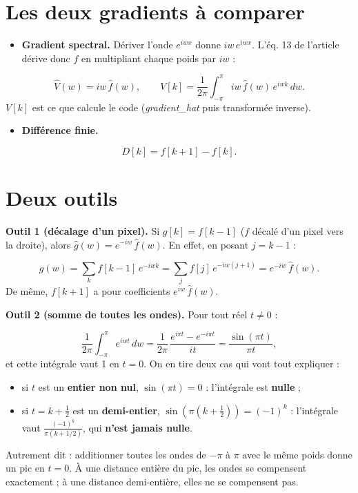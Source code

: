 \documentclass[11pt,a4paper]{article}
\begin{document}
\section*{Les deux gradients à comparer}
\begin{itemize}
\item \textbf{Gradient spectral.} Dériver l'onde $e^{iwx}$ donne $iw\, e^{iwx}$. L'éq. 13 de l'article dérive donc $f$ en multipliant chaque poids par $iw$ :
\end{itemize}
\begin{equation}
\hat{V}(w) = iw\, \hat{f}(w), \qquad V[k] = \frac{1}{2\pi} \int_{-\pi}^{\pi} iw\, \hat{f}(w)\, e^{iwk}\, dw .
\end{equation}
$V[k]$ est ce que calcule le code (\emph{gradient\_hat} puis transformée inverse).

\begin{itemize}
\item \textbf{Différence finie.}
\end{itemize}
\begin{equation}
D[k] = f[k+1] - f[k] .
\end{equation}
\section*{Deux outils}
\textbf{Outil 1 (décalage d'un pixel).} Si $g[k] = f[k-1]$ ($f$ décalé d'un pixel vers la droite), alors $\hat{g}(w) = e^{-iw}\, \hat{f}(w)$. En effet, en posant $j = k - 1$ :

\[
\hat{g}(w) = \sum_k f[k-1]\, e^{-iwk} = \sum_j f[j]\, e^{-iw(j+1)} = e^{-iw}\, \hat{f}(w) .
\]
De même, $f[k+1]$ a pour coefficients $e^{iw}\, \hat{f}(w)$.

\textbf{Outil 2 (somme de toutes les ondes).} Pour tout réel $t \neq 0$ :

\begin{equation}
\frac{1}{2\pi} \int_{-\pi}^{\pi} e^{iwt}\, dw = \frac{1}{2\pi}\, \frac{e^{i\pi t} - e^{-i\pi t}}{it} = \frac{\sin(\pi t)}{\pi t} ,
\end{equation}
et cette intégrale vaut 1 en $t = 0$. On en tire deux cas qui vont tout expliquer :

\begin{itemize}
\item si $t$ est un \textbf{entier non nul}, $\sin(\pi t) = 0$ : l'intégrale est \textbf{nulle} ;
\item si $t = k + \frac{1}{2}$ est un \textbf{demi-entier}, $\sin(\pi(k + \frac{1}{2})) = (-1)^k$ : l'intégrale vaut $\frac{(-1)^k}{\pi (k + 1/2)}$, qui \textbf{n'est jamais nulle}.
\end{itemize}
Autrement dit : additionner toutes les ondes de $-\pi$ à $\pi$ avec le même poids donne un pic en $t = 0$. À une distance entière du pic, les ondes se compensent exactement ; à une distance demi-entière, elles ne se compensent pas.
\end{document}

